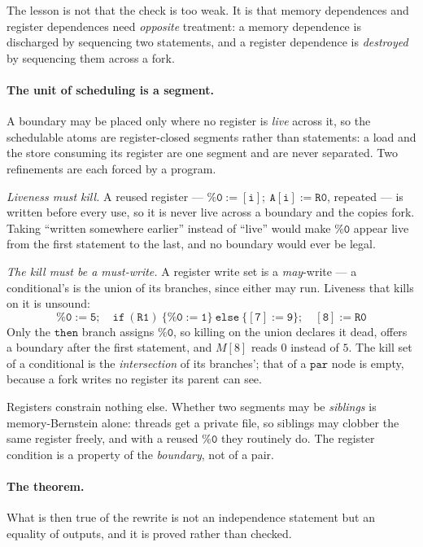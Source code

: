 \documentclass[11pt,a4paper]{article}
\theoremstyle{definition}
\theoremstyle{plain}
\theoremstyle{remark}
\begin{document}
The lesson is not that the check is too weak. It is that memory dependences and register
dependences need \emph{opposite} treatment: a memory dependence is discharged by sequencing
two statements, and a register dependence is \emph{destroyed} by sequencing them across a
fork.

\paragraph{The unit of scheduling is a segment.}
A boundary may be placed only where no register is \emph{live} across it, so the schedulable
atoms are register-closed segments rather than statements: a load and the store consuming its
register are one segment and are never separated. Two refinements are each forced by a
program.

\emph{Liveness must kill.} A reused register --- $\mathtt{\%0\!:=\![i];\ A[i]\!:=\!R0}$,
repeated --- is written before every use, so it is never live across a boundary and the
copies fork. Taking ``written somewhere earlier'' instead of ``live'' would make
$\mathtt{\%0}$ appear live from the first statement to the last, and no boundary would ever
be legal.

\emph{The kill must be a must-write.} A register write set is a \emph{may}-write --- a
conditional's is the union of its branches, since either may run. Liveness that kills on it
is unsound:
\[
  \mathtt{\%0\!:=\!5};\quad \mathtt{if\ (R1)\ \{\%0\!:=\!1\}\ else\ \{[7]\!:=\!9\}};\quad
  \mathtt{[8]\!:=\!R0}
\]
Only the $\texttt{then}$ branch assigns $\mathtt{\%0}$, so killing on the union declares it
dead, offers a boundary after the first statement, and $M[8]$ reads $0$ instead of $5$. The
kill set of a conditional is the \emph{intersection} of its branches'; that of a
$\texttt{par}$ node is empty, because a fork writes no register its parent can see.

Registers constrain nothing else. Whether two segments may be \emph{siblings} is
memory-Bernstein alone: threads get a private file, so siblings may clobber the same register
freely, and with a reused $\mathtt{\%0}$ they routinely do. The register condition is a
property of the \emph{boundary}, not of a pair.

\paragraph{The theorem.} What is then true of the rewrite is not an independence statement but
an equality of outputs, and it is proved rather than checked.
\end{document}
